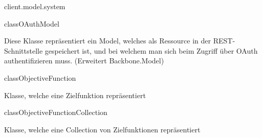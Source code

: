 \begin{texdocpackage}{client.model.system}
\begin{texdocclass}{class}{OAuthModel}
\label{texdoclet:edu.kit.informatik.studyplan.client.model.system.OAuthModel}
\begin{texdocclassintro}
Diese Klasse repräsentiert ein Model, welches als Ressource in der
 REST-Schnittstelle gespeichert ist, und bei welchem man sich beim Zugriff
 über OAuth authentifizieren muss. (Erweitert Backbone.Model)\end{texdocclassintro}
\begin{texdocclassfields}
\end{texdocclassfields}
\begin{texdocclassconstructors}
\end{texdocclassconstructors}
\end{texdocclass}


\begin{texdocclass}{class}{ObjectiveFunction}
\label{texdoclet:edu.kit.informatik.studyplan.client.model.system.ObjectiveFunction}
\begin{texdocclassintro}
Klasse, welche eine Zielfunktion repräsentiert\end{texdocclassintro}
\begin{texdocclassfields}
\end{texdocclassfields}
\begin{texdocclassconstructors}
\end{texdocclassconstructors}
\end{texdocclass}


\begin{texdocclass}{class}{ObjectiveFunctionCollection}
\label{texdoclet:edu.kit.informatik.studyplan.client.model.system.ObjectiveFunctionCollection}
\begin{texdocclassintro}
Klasse, welche eine Collection von Zielfunktionen repräsentiert\end{texdocclassintro}
\begin{texdocclassfields}
\end{texdocclassfields}
\begin{texdocclassconstructors}
\end{texdocclassconstructors}
\end{texdocclass}



\end{texdocpackage}
